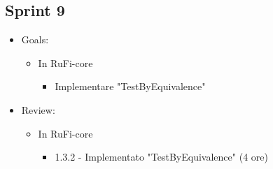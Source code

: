 \documentclass[12pt, a4paper]{article}
\begin{document}
\subsection*{Sprint 9}

\begin{itemize}
    \item Goals:
          \begin{itemize}
              \color{teal}
              \item In RuFi-core
                    \begin{itemize}
                        \item Implementare "TestByEquivalence"
                    \end{itemize}
          \end{itemize}
    \item Review:
          \begin{itemize}
              \color{teal}
              \item In RuFi-core
                    \begin{itemize}
                        \item 1.3.2 - Implementato "TestByEquivalence" (4 ore)
                    \end{itemize}
          \end{itemize}
\end{itemize}
\end{document}
